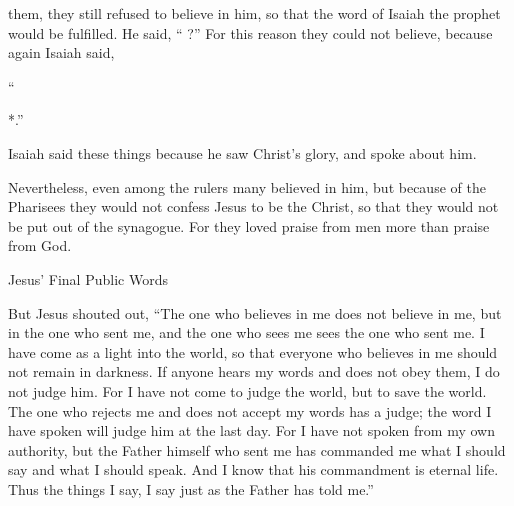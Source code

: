 {them,
they still
refused
to believe
in
him,
so that
the word
of Isaiah
the prophet
would be fulfilled.
He said, “{}
{}?”
For
this reason
they could
not
believe,
because
again
Isaiah
said,
\par }{\Q {}“{}
\par }{
\par }{
\par }{
\par }{*.”
\par }{\PI {}Isaiah
said
these things
because
he saw
Christ’s
glory,
and
spoke
about
him.
\par }{\PP {}Nevertheless,
even
among
the rulers
many
believed
in
him,
but
because
of the Pharisees
they would
not
confess
Jesus to be the Christ, so that
they would
not
be
put out of the synagogue.
For
they loved
praise
from men
more
than
praise
from God.
\par }{\SH Jesus’ Final Public Words
\par }{\PP {}But
Jesus
shouted out, “The one who believes
in
me
does
not
believe
in
me,
but
in
the one who sent
me,
and
the one who sees
me
sees
the one who sent
me.
I
have come
as a light
into
the world,
so that
everyone
who believes
in
me
should
not
remain
in
darkness.
If
anyone
hears
my
words
and
does
not
obey
them, I
do
not
judge
him.
For
I have
not
come
to
judge
the world,
but
to
save
the world.
The one who rejects
me
and
does
not
accept
my
words
has
a judge;
the word
I have spoken
will judge
him
at
the last
day.
For
I
have
not
spoken
from
my own authority,
but
the Father
himself
who sent
me
has commanded
me
what
I should say
and
what
I should speak.
And
I know
that
his
commandment
is
eternal
life.
Thus
the things I
say,
I say
just as
the Father
has told
me.”

}
